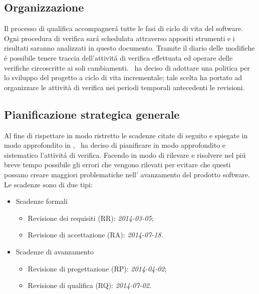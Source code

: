 \subsection{Organizzazione}
Il processo di qualifica accompagner\'a tutte le fasi di ciclo di vita del software. Ogni procedura di verifica sar\'a schedulata attraverso appositi strumenti e i risultati saranno analizzati in questo documento. Tramite il diario delle modifiche \'e possibile tenere traccia dell'attivit\'a di verifica effettuata ed operare delle verifiche circoscritte ai soli cambiamenti.
\gruppo ~ha deciso di adottare una politica per lo sviluppo del progetto a ciclo di vita incrementale; tale scelta ha portato ad organizzare le attività di verifica nei periodi temporali antecedenti le revisioni.
\subsection{Pianificazione strategica generale}
Al fine di rispettare in modo ristretto le scadenze citate di seguito e spiegate in modo approfondito in \infoPDP, \gruppo ~ha deciso di pianificare in modo approfondito e sistematico l'attivit\'a di verifica. Facendo in modo di rilevare e risolvere nel pi\'u breve tempo possibile gli errori che vengono rilevati per evitare che questi possano creare maggiori problematiche nell' avanzamento del prodotto software. Le scadenze sono di due tipi:
\begin{itemize}
\item Scadenze formali
\begin{itemize}
\item Revisione dei requisiti (RR): \textit{2014-03-05};
\item Revisione di accettazione (RA): \textit{2014-07-18}.
\end{itemize}
\item Scadenze di avanzamento
\begin{itemize}
\item Revisione di progettazione (RP): \textit{2014-04-02};
\item Revisione di qualifica (RQ): \textit{2014-07-02}.
\end{itemize}
\end{itemize}
